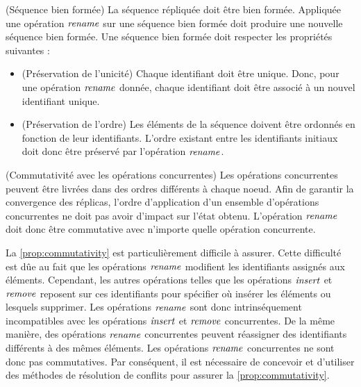 \begin{property}(Séquence bien formée)
  La séquence répliquée doit être bien formée.
  Appliquée une opération $\mathit{rename}$ sur une séquence bien formée doit produire une nouvelle séquence bien formée.
  Une séquence bien formée doit respecter les propriétés suivantes :
  \begin{itemize}[noitemsep]
    \item[~]
    \begin{subproperty}(Préservation de l'unicité)
      Chaque identifiant doit être unique.
      Donc, pour une opération $\mathit{rename}$ donnée, chaque identifiant doit être associé à un nouvel identifiant unique.
    \end{subproperty}
    \item[~]
    \begin{subproperty}(Préservation de l'ordre)
      \label{prop:order}
      Les éléments de la séquence doivent être ordonnés en fonction de leur identifiants.
      L'ordre existant entre les identifiants initiaux doit donc être préservé par l'opération $\mathit{rename}$.
    \end{subproperty}
  \end{itemize}
\end{property}

\begin{property}(Commutativité avec les opérations concurrentes)
  \label{prop:commutativity}
  Les opérations concurrentes peuvent être livrées dans des ordres différents à chaque noeud.
  Afin de garantir la convergence des réplicas, l'ordre d'application d'un ensemble d'opérations concurrentes ne doit pas avoir d'impact sur l'état obtenu.
  L'opération $\mathit{rename}$ doit donc être commutative avec n'importe quelle opération concurrente.
\end{property}

La \autoref{prop:commutativity} est particulièrement difficile à assurer.
Cette difficulté est dûe au fait que les opérations $\mathit{rename}$ modifient les identifiants assignés aux éléments.
Cependant, les autres opérations telles que les opérations $\mathit{insert}$ et $\mathit{remove}$ reposent sur ces identifiants pour spécifier où insérer les éléments ou lesquels supprimer.
Les opérations $\mathit{rename}$ sont donc intrinséquement incompatibles avec les opérations $\mathit{insert}$ et $\mathit{remove}$ concurrentes.
De la même manière, des opérations $\mathit{rename}$ concurrentes peuvent réassigner des identifiants différents à des mêmes éléments.
Les opérations $\mathit{rename}$ concurrentes ne sont donc pas commutatives.
Par conséquent, il est nécessaire de concevoir et d'utiliser des méthodes de résolution de conflits pour assurer la \autoref{prop:commutativity}.\\

